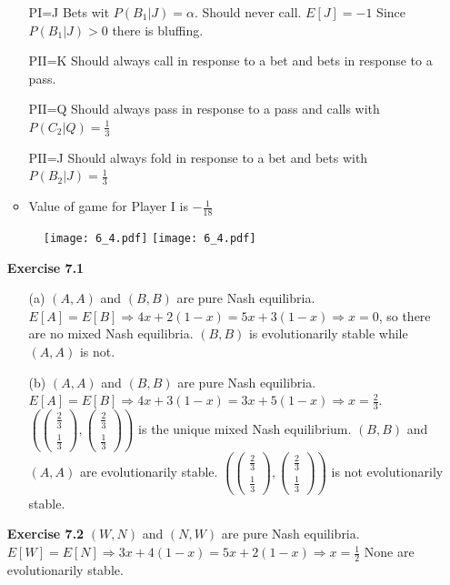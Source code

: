 \documentclass[10pt]{article}[H]
\begin{document}
\begin{itemize}
\begin{itemize}
        \item [PI=J] Bets wit $P(B_1|J)=\alpha$. Should never call. $E[J]=-1$ Since $P(B_1|J)>0$ there is bluffing.
        \item [PII=K] Should always call in response to a bet and bets in response to a pass.
        \item [PII=Q] Should always pass in response to a pass and calls with $P(C_2|Q)=\frac{1}{3}$
        \item [PII=J] Should always fold in response to a bet and bets with $P(B_2|J)=\frac{1}{3}$
        \item Value of game for Player I is $-\frac{1}{18}$
    \end{itemize}
    \begin{figure}[H]
        \texttt{[image: 6\_4.pdf]}
        \texttt{[image: 6\_4.pdf]}
    \end{figure}
    \item [\textbf{Exercise 7.1}] \begin{itemize}
        \item [(a)] $(A,A)$ and $(B,B)$ are pure Nash equilibria. $E[A]=E[B]\Rightarrow 4x+2(1-x)=5x+3(1-x)\Rightarrow x=0$, so there are no mixed Nash equilibria. $(B,B)$ is evolutionarily stable while $(A,A)$ is not.
        \item [(b)] $(A,A)$ and $(B,B)$ are pure Nash equilibria. $E[A]=E[B]\Rightarrow 4x+3(1-x)=3x+5(1-x)\Rightarrow x=\frac{2}{3}$. $(\begin{pmatrix}
            \frac{2}{3}\\
            \frac{1}{3}
        \end{pmatrix},
        \begin{pmatrix}
            \frac{2}{3}\\
            \frac{1}{3}
        \end{pmatrix})$ is the unique mixed Nash equilibrium. $(B,B)$ and $(A,A)$ are evolutionarily stable. $(\begin{pmatrix}
            \frac{2}{3}\\
            \frac{1}{3}
        \end{pmatrix},
        \begin{pmatrix}
            \frac{2}{3}\\
            \frac{1}{3}
        \end{pmatrix})$ is not evolutionarily stable.
    \end{itemize}
    \item [\textbf{Exercise 7.2}] $(W,N)$ and $(N,W)$ are pure Nash equilibria. $E[W]=E[N]\Rightarrow 3x+4(1-x)=5x+2(1-x)\Rightarrow x=\frac{1}{2}$ None are evolutionarily stable.

\end{itemize}
\end{document}
